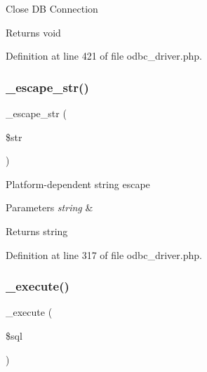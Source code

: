 Close DB Connection

\begin{DoxyReturn}{Returns}
void 
\end{DoxyReturn}


Definition at line 421 of file odbc\+\_\+driver.\+php.

\mbox{\label{class_c_i___d_b__odbc__driver_af8ef0237bfcdb19215b63fff769e7a55}} 
\subsubsection{\texorpdfstring{\_escape\_str()}{\_escape\_str()}}
{\footnotesize\ttfamily \+\_\+escape\+\_\+str (\begin{DoxyParamCaption}\item[{}]{\$str }\end{DoxyParamCaption})\hspace{0.3cm}{\ttfamily [protected]}}

Platform-\/dependent string escape


\begin{DoxyParams}{Parameters}
{\em string} & \\
\hline
\end{DoxyParams}
\begin{DoxyReturn}{Returns}
string 
\end{DoxyReturn}


Definition at line 317 of file odbc\+\_\+driver.\+php.

\mbox{\label{class_c_i___d_b__odbc__driver_a114ab675d89bf8324a41785fb475e86d}} 
\subsubsection{\texorpdfstring{\_execute()}{\_execute()}}
{\footnotesize\ttfamily \+\_\+execute (\begin{DoxyParamCaption}\item[{}]{\$sql }\end{DoxyParamCaption})\hspace{0.3cm}{\ttfamily [protected]}}

